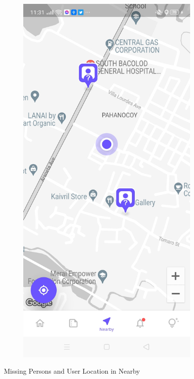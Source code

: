 \begin{figure}[!h]
\begin{subfigure}[c]{0.40\linewidth}
    \end{subfigure}
    \centering
    \begin{subfigure}[c]{0.40\linewidth}
        \centering
        \includegraphics[scale=0.15]{figures/Chapter4/Main/Nearby-2.jpg}
    \end{subfigure}
    \caption{Missing Persons and User Location in Nearby}
    \label{fig:userTracking}
\end{figure}

